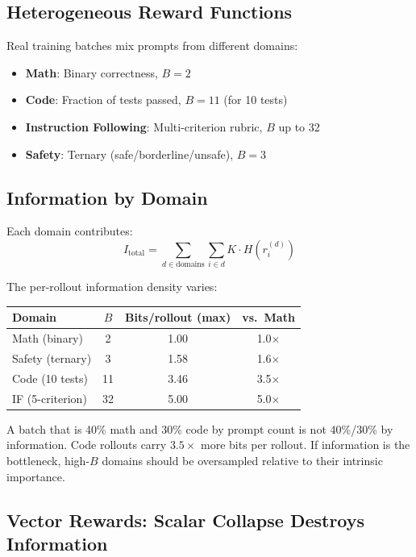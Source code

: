 \documentclass[11pt,a4paper]{article}
\theoremstyle{definition}
\theoremstyle{remark}
\begin{document}
\subsection{Heterogeneous Reward Functions}

Real training batches mix prompts from different domains:
\begin{itemize}
    \item \textbf{Math}: Binary correctness, $B = 2$
    \item \textbf{Code}: Fraction of tests passed, $B = 11$ (for 10 tests)
    \item \textbf{Instruction Following}: Multi-criterion rubric, $B$ up to 32
    \item \textbf{Safety}: Ternary (safe/borderline/unsafe), $B = 3$
\end{itemize}

\subsection{Information by Domain}

Each domain contributes:
\[
I_{\text{total}} = \sum_{d \in \text{domains}} \sum_{i \in d} K \cdot H(r_i^{(d)})
\]

The per-rollout information density varies:

\begin{center}
\begin{tabular}{@{}lccc@{}}
\toprule
\textbf{Domain} & $B$ & \textbf{Bits/rollout (max)} & \textbf{vs.\ Math} \\
\midrule
Math (binary) & 2 & 1.00 & 1.0$\times$ \\
Safety (ternary) & 3 & 1.58 & 1.6$\times$ \\
Code (10 tests) & 11 & 3.46 & 3.5$\times$ \\
IF (5-criterion) & 32 & 5.00 & 5.0$\times$ \\
\bottomrule
\end{tabular}
\end{center}

\begin{takeaway}
A batch that is 40\% math and 30\% code by prompt count is not 40\%/30\% by information. Code rollouts carry $3.5\times$ more bits per rollout. If information is the bottleneck, high-$B$ domains should be oversampled relative to their intrinsic importance.
\end{takeaway}

\subsection{Vector Rewards: Scalar Collapse Destroys Information}
\end{document}
